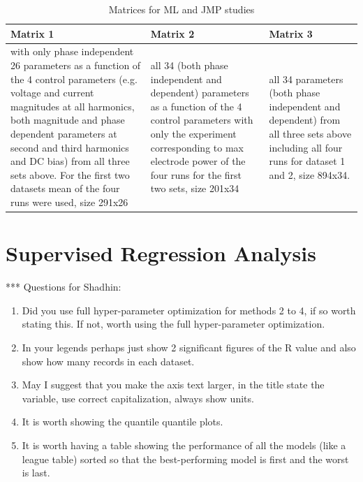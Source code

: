 \documentclass[12pt]{iopart}
\begin{document}
\begin{table}[]
    \centering
\begin{tabular}{ |p{4cm}|p{4cm}|p{4cm}| }
        \hline
        Matrix 1 & Matrix 2 & Matrix 3 \\
        \hline
         with only phase independent 26 parameters as a function of the 4 control parameters (e.g. voltage and current magnitudes at all harmonics, both magnitude and phase dependent parameters at second and third harmonics and DC bias) from all three sets above. For the first two datasets mean of the four runs were used, size 291x26 &  all 34 (both phase independent and dependent) parameters as a function of the 4 control parameters with only the experiment corresponding to max electrode power of the four runs for the first two sets, size 201x34 & all 34 parameters (both phase independent and dependent) from all three sets above including all four runs for dataset 1 and 2, size 894x34.\\
        \hline
    \end{tabular}
    \caption{Matrices for ML and JMP studies }
    \label{tab:ML_matrices}
\end{table}


\section{ Supervised Regression Analysis}\label{Sect:RegressionAnalysis}

*** Questions for Shadhin: 

\begin{enumerate}
    \item Did you use full hyper-parameter optimization for methods 2 to 4, if so worth stating this. If not, worth using the full hyper-parameter optimization.
    \item In your legends perhaps just show 2 significant figures of the R value and also show how many records in each dataset.
    \item May I suggest that you make the axis text larger, in the title state the variable, use correct capitalization, always show units. 
    \item It is worth showing the quantile quantile plots.
    \item It is worth having a table showing the performance of all the models (like a league table) sorted so that the best-performing model is first and the worst is last.

\end{enumerate}
\end{document}
